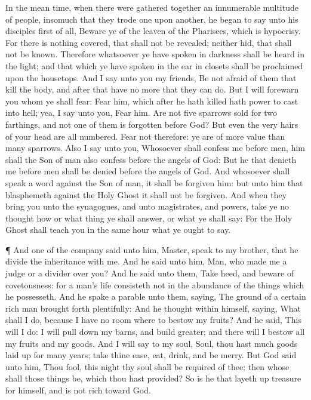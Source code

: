  In the mean time, when there were gathered together an
innumerable multitude of people, insomuch that they trode one upon
another, he began to say unto his disciples first of all, Beware ye of
the leaven of the Pharisees, which is hypocrisy.  For there
is nothing covered, that shall not be revealed; neither hid, that shall
not be known.  Therefore whatsoever ye have spoken in
darkness shall be heard in the light; and that which ye have spoken in
the ear in closets shall be proclaimed upon the housetops. 
And I say unto you my friends, Be not afraid of them that kill the body,
and after that have no more that they can do.  But I will
forewarn you whom ye shall fear: Fear him, which after he hath killed
hath power to cast into hell; yea, I say unto you, Fear him.
 Are not five sparrows sold for two farthings, and not one
of them is forgotten before God?  But even the very hairs of
your head are all numbered. Fear not therefore: ye are of more value
than many sparrows.  Also I say unto you, Whosoever shall
confess me before men, him shall the Son of man also confess before the
angels of God:  But he that denieth me before men shall be
denied before the angels of God.  And whosoever shall speak
a word against the Son of man, it shall be forgiven him: but unto him
that blasphemeth against the Holy Ghost it shall not be forgiven.
 And when they bring you unto the synagogues, and unto
magistrates, and powers, take ye no thought how or what thing ye shall
answer, or what ye shall say:  For the Holy Ghost shall
teach you in the same hour what ye ought to say.

 ¶ And one of the company said unto him, Master, speak to
my brother, that he divide the inheritance with me.  And he
said unto him, Man, who made me a judge or a divider over you?
 And he said unto them, Take heed, and beware of
covetousness: for a man's life consisteth not in the abundance of the
things which he possesseth.  And he spake a parable unto
them, saying, The ground of a certain rich man brought forth
plentifully:  And he thought within himself, saying, What
shall I do, because I have no room where to bestow my fruits?
 And he said, This will I do: I will pull down my barns,
and build greater; and there will I bestow all my fruits and my goods.
 And I will say to my soul, Soul, thou hast much goods laid
up for many years; take thine ease, eat, drink, and be merry.
 But God said unto him, Thou fool, this night thy soul
shall be required of thee: then whose shall those things be, which thou
hast provided?  So is he that layeth up treasure for
himself, and is not rich toward God.

